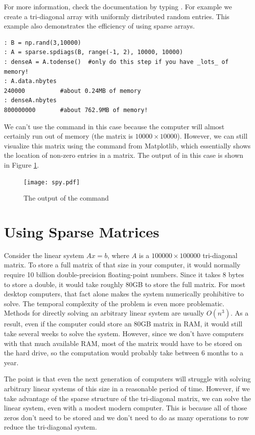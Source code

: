 For more information, check the documentation by typing . 
For example we create a tri-diagonal array with uniformly distributed random entries. 
This example also demonstrates the efficiency of using sparse arrays.
\begin{lstlisting}
: B = np.rand(3,10000)
: A = sparse.spdiags(B, range(-1, 2), 10000, 10000)
: denseA = A.todense()  #only do this step if you have _lots_ of memory!
: A.data.nbytes
240000          #about 0.24MB of memory
: denseA.nbytes
800000000       #about 762.9MB of memory!
\end{lstlisting}
We can't use the  command in this case because the computer will almost 
certainly run out of memory (the matrix is $10000 \times 10000$). 
However, we can still visualize this matrix using the  command from Matplotlib, 
which essentially shows the location of non-zero entries in a matrix. 
The output of  in this case is shown in Figure \ref{fig:mpl_spy}.
\begin{figure}[h]
\centering
\texttt{[image: spy.pdf]}
\caption{The output of the  command}
\label{fig:mpl_spy}
\end{figure}

\section*{Using Sparse Matrices}
Consider the linear system $A x = b$, where $A$ is a $100000\times 100000$ tri-diagonal matrix. 
To store a full matrix of that size in your computer, it would normally require 10
billion double-precision floating-point numbers.  Since it takes 8
bytes to store a double, it would take roughly 80GB to store the
full matrix.  For most desktop computers, that fact alone makes the
system numerically prohibitive to solve. 
The temporal complexity of the problem is even more problematic. 
Methods for directly solving an arbitrary linear system are usually $O(n^3)$.  
As a result, even if the computer could store an 80GB matrix in RAM, it
would still take several weeks to solve the system.  However, since
we don't have computers with that much available RAM, most of the
matrix would have to be stored on the hard drive, so the computation
would probably take between $6$ months to a year.

The point is that even the next generation of computers will
struggle with solving arbitrary linear systems of this size in a
reasonable period of time.  However, if we take advantage of the
sparse structure of the tri-diagonal matrix, we can solve the linear
system, even with a modest modern computer.  This is because all of
those zeros don't need to be stored and we don't need to do as many
operations to row reduce the tri-diagonal system.

